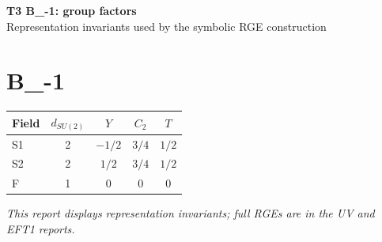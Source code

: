 \documentclass[10pt,a4paper]{article}
\begin{document}
\begin{center}
{\Large\bfseries T3 B\_-1: group factors}\\[4pt]
Representation invariants used by the symbolic RGE construction
\end{center}
\bigskip
\section*{B\_-1}
\begin{longtable}{@{}lcccc@{}}
\toprule Field & $d_{SU(2)}$ & $Y$ & $C_2$ & $T$ \\
\midrule
S1 & 2 & $-1/2$ & $3/4$ & $1/2$ \\
S2 & 2 & $1/2$ & $3/4$ & $1/2$ \\
F & 1 & $0$ & $0$ & $0$ \\
\bottomrule
\end{longtable}
\emph{This report displays representation invariants; full RGEs are in the UV and EFT1 reports.}
\end{document}
